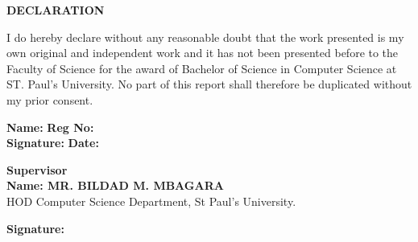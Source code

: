 \documentclass[a4paper,12pt]{report}
\begin{document}
\newpage

\begin{center}
    {\LARGE \textbf{DECLARATION}}
\end{center}

\vspace{1cm}

I do hereby declare without any reasonable doubt that the work presented is my own original and independent work and it has not been presented before to the Faculty of Science for the award of Bachelor of Science in Computer Science at ST. Paul’s University. No part of this report shall therefore be duplicated without my prior consent.

\vspace{2cm}

\begin{flushleft}
    \textbf{Name:} \underline{\hspace{4cm}} 
    \textbf{Reg No:} \underline{\hspace{4cm}} \\
    \vspace{0.5cm}
    \textbf{Signature:} \underline{\hspace{4cm}} \hspace{1cm} \textbf{Date:} \underline{\hspace{4cm}} \\
\end{flushleft}

\vspace{2cm}

\begin{flushleft}
    \textbf{Supervisor} \\

    \textbf{Name: MR. BILDAD M. MBAGARA } \\
    HOD Computer Science Department, St Paul’s University.
    
    \vspace{0.5cm}
    \textbf{Signature:} \underline{\hspace{4cm}}
\end{flushleft}

\vfill
\newpage

\newpage
\end{document}
